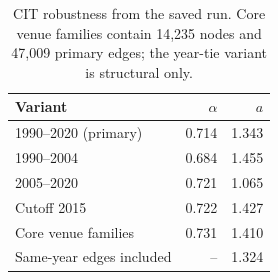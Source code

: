 \begin{table}[t]
\centering\small
\begin{tabular}{@{}lrr@{}}
\toprule
Variant & $\alpha$ & $a$\\
\midrule
1990--2020 (primary) & 0.714 & 1.343\\
1990--2004 & 0.684 & 1.455\\
2005--2020 & 0.721 & 1.065\\
Cutoff 2015 & 0.722 & 1.427\\
Core venue families & 0.731 & 1.410\\
Same-year edges included & -- & 1.324\\
\bottomrule
\end{tabular}
\caption{CIT robustness from the saved run. Core venue families contain 14,235
nodes and 47,009 primary edges; the year-tie variant is structural only.}
\label{tab:b-robustness}
\end{table}
